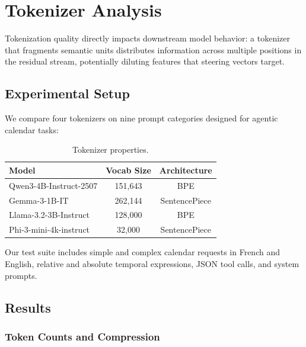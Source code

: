 \documentclass[11pt,a4paper]{article}
\begin{document}
\section{Tokenizer Analysis}
\label{sec:tokenizers}

Tokenization quality directly impacts downstream model behavior: a tokenizer that fragments semantic units distributes information across multiple positions in the residual stream, potentially diluting features that steering vectors target.

\subsection{Experimental Setup}

We compare four tokenizers on nine prompt categories designed for agentic calendar tasks:

\begin{table}[H]
\centering
\caption{Tokenizer properties.}
\label{tab:tokenizers}
\begin{tabular}{lcc}
\toprule
\textbf{Model} & \textbf{Vocab Size} & \textbf{Architecture} \\
\midrule
Qwen3-4B-Instruct-2507 & 151,643 & BPE \\
Gemma-3-1B-IT & 262,144 & SentencePiece \\
Llama-3.2-3B-Instruct & 128,000 & BPE \\
Phi-3-mini-4k-instruct & 32,000 & SentencePiece \\
\bottomrule
\end{tabular}
\end{table}

Our test suite includes simple and complex calendar requests in French and English, relative and absolute temporal expressions, JSON tool calls, and system prompts.

\subsection{Results}

\subsubsection{Token Counts and Compression}
\end{document}
